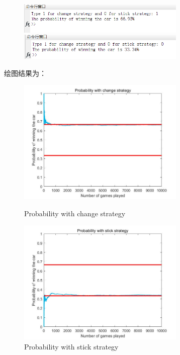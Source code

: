\begin{figure}[htbp]
	\centering
	\begin{minipage}[t]{0.48\textwidth}
		\centering
		\includegraphics[width=8cm]{figure/out2(1).png}
	\end{minipage}
	\begin{minipage}[t]{0.48\textwidth}
		\centering
		\includegraphics[width=8cm]{figure/out2(2).png}
	\end{minipage}
\end{figure}

绘图结果为：

\begin{figure}[htbp]
	\centering
	\begin{minipage}[t]{0.48\textwidth}
		\centering
		\includegraphics[width=8cm]{figure/change.jpg}
		\caption{Probability with change strategy}
	\end{minipage}
	\begin{minipage}[t]{0.48\textwidth}
		\centering
		\includegraphics[width=8cm]{figure/stick.jpg}
		\caption{Probability with stick strategy}
	\end{minipage}
\end{figure}